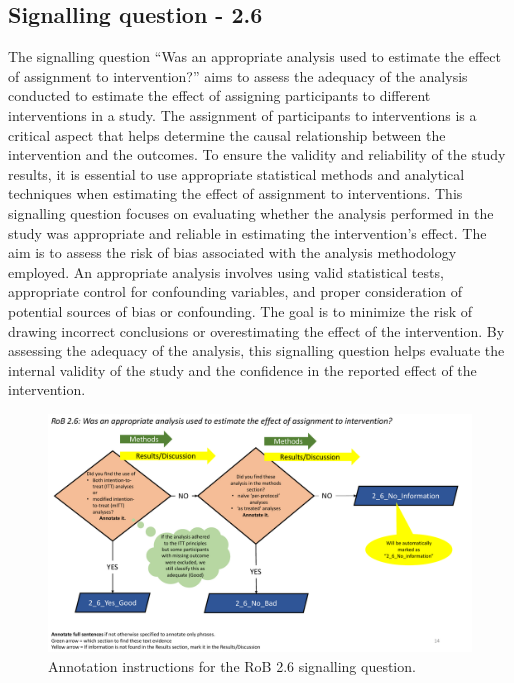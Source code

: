 \documentclass[sn-mathphys,Numbered]{sn-jnl}%
\begin{document}
\subsection*{Signalling question - 2.6 }
%
The signalling question ``Was an appropriate analysis used to estimate the effect of assignment to intervention?'' aims to assess the adequacy of the analysis conducted to estimate the effect of assigning participants to different interventions in a study.
The assignment of participants to interventions is a critical aspect that helps determine the causal relationship between the intervention and the outcomes.
To ensure the validity and reliability of the study results, it is essential to use appropriate statistical methods and analytical techniques when estimating the effect of assignment to interventions.
This signalling question focuses on evaluating whether the analysis performed in the study was appropriate and reliable in estimating the intervention's effect.
The aim is to assess the risk of bias associated with the analysis methodology employed.
An appropriate analysis involves using valid statistical tests, appropriate control for confounding variables, and proper consideration of potential sources of bias or confounding. 
The goal is to minimize the risk of drawing incorrect conclusions or overestimating the effect of the intervention.
By assessing the adequacy of the analysis, this signalling question helps evaluate the internal validity of the study and the confidence in the reported effect of the intervention.


%
%
%
\begin{figure}[hbt]
    \centering
    \includegraphics[width=\textwidth]{figures/2_6.pdf}
    \caption{Annotation instructions for the RoB 2.6 signalling question.}
    \label{fig:2_6}
\end{figure}
%
%
%
\end{document}
